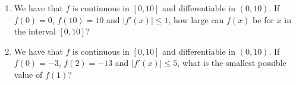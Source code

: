 \begin{enumerate}[ref={\fcProblemRef}]
\item We have that $f$ is continuous in $[0,10]$ and differentiable in $(0,10)$. If $f(0)=0$, $f(10)=10$ and $|f'(x)|\leq 1$, how large can $f(x)$ be for $x$ in the interval $[0,10]$?

\item We have that $f$ is continuous in $[0,10]$ and differentiable in $(0,10)$. If $f(0)=-3$, $f(2)=-13$ and $|f'(x)|\leq 5$, what is the smallest possible value of $f(1)$?

\end{enumerate}
